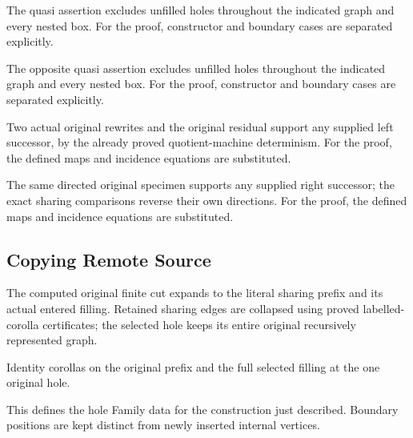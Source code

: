 The quasi assertion excludes unfilled holes throughout the indicated graph and every nested box.
For the proof, constructor and boundary cases are separated explicitly.
\par{}

The opposite quasi assertion excludes unfilled holes throughout the indicated graph and every nested box.
For the proof, constructor and boundary cases are separated explicitly.
\par{}

Two actual original rewrites and the original residual support any supplied left successor, by the already proved quotient-machine determinism.
For the proof, the defined maps and incidence equations are substituted.
\par{}

The same directed original specimen supports any supplied right successor; the exact sharing comparisons reverse their own directions.
For the proof, the defined maps and incidence equations are substituted.
\par{}

\subsection{Copying Remote Source}
The computed original finite cut expands to the literal sharing prefix and its actual entered filling. Retained sharing edges are collapsed using proved labelled-corolla certificates; the selected hole keeps its entire original recursively represented graph.

Identity corollas on the original prefix and the full selected filling at the one original hole.
\par{}

This defines the hole Family data for the construction just described. Boundary positions are kept distinct from newly inserted internal vertices.
\par{}

